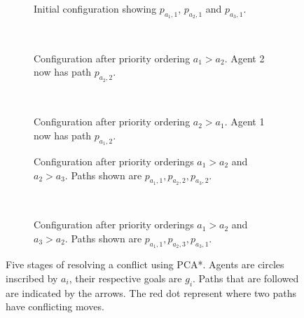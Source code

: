 \begin{figure}
    \centering
    \begin{subfigure}[t]{.3\textwidth}
        \centering
        \def\svgscale{.6}
        
        \caption{Initial configuration showing $p_{a_1,1}$, $p_{a_2,1}$ and 
            $p_{a_3,1}$.}
        \label{fig:pca-initial}
    \end{subfigure}
    ~
    \begin{subfigure}[t]{.3\textwidth}
        \centering
        \def\svgscale{.6}
        
        \caption{Configuration after priority ordering $a_1 > a_2$. Agent 2 now 
            has path $p_{a_2,2}$.}
        \label{fig:pca-2}
    \end{subfigure}
    ~
    \begin{subfigure}[t]{.3\textwidth}
        \centering
        \def\svgscale{.6}
        
        \caption{Configuration after priority ordering $a_2 > a_1$. Agent 1 now 
            has path $p_{a_1,2}$.}
        \label{fig:pca-3}
    \end{subfigure}
    
    \begin{subfigure}[t]{.4\textwidth}
        \centering
        \def\svgscale{.6}
        
        \caption{Configuration after priority orderings $a_1 > a_2$ and $a_2 > 
            a_3$. Paths shown are $p_{a_1,1}, p_{a_2,2}, p_{a_3,2}$.}
        \label{fig:pca-4}
    \end{subfigure}
    ~
    \begin{subfigure}[t]{.4\textwidth}
        \centering
        \def\svgscale{.6}
        
        \caption{Configuration after priority orderings $a_1 > a_2$ and $a_3 > 
            a_2$. Paths shown are $p_{a_1,1}, p_{a_2,3}, p_{a_3,1}$.}
        \label{fig:pca-5}
    \end{subfigure}
    
    \caption{Five stages of resolving a conflict using PCA*. Agents are circles
        inscribed by $a_i$, their respective goals are $g_i$. Paths that are 
        followed are indicated by the arrows. The red dot represent where two 
        paths have conflicting moves.}
    \label{fig:pca-example}
\end{figure}

